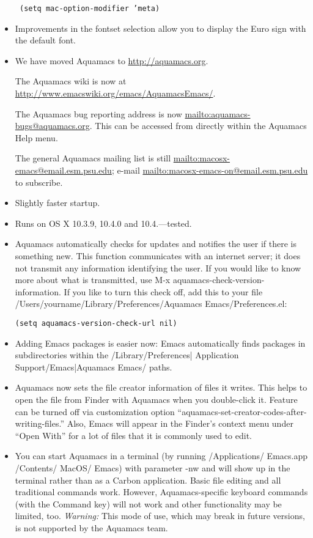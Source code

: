 \begin{itemize}
\texttt{    (setq mac-option-modifier 'meta)}

	 \item Improvements in the fontset selection allow you to display the  Euro sign
    with the default font.
     

\item We have moved Aquamacs to \url{http://aquamacs.org}.

 The Aquamacs wiki is now at \url{http://www.emacswiki.org/emacs/AquamacsEmacs/}.

 The Aquamacs bug reporting address is now \url{mailto:aquamacs-bugs@aquamacs.org}. This can be accessed from directly within the Aquamacs Help menu.

 The general Aquamacs mailing list is still \url{mailto:macosx-emacs@email.esm.psu.edu}; e-mail \url{mailto:macosx-emacs-on@email.esm.psu.edu} to subscribe.
 

\item Slightly faster startup.

\item Runs on OS X 10.3.9, 10.4.0 and 10.4.---tested.

\item Aquamacs automatically checks for updates and notifies the user
    if there is something new. This function communicates with an internet server; it does not
    transmit any information identifying the user. If you would like to
    know more about what is transmitted, use M-x
    aquamacs-check-version-information. If you like to turn this check off, add this to your file
 /Users/yourname/Library/Preferences/Aquamacs Emacs/Preferences.el:

    \texttt{(setq aquamacs-version-check-url nil)}

\item Adding Emacs packages is easier now: Emacs automatically finds
    packages in subdirectories within the /Library/{Preferences| Application
    Support}/{Emacs|Aquamacs Emacs}/ paths.

\item Aquamacs now sets the file creator information of files it
    writes. This helps to open the file from Finder with Aquamacs when
    you double-click it. Feature can be turned off via customization
    option ``aquamacs-set-creator-codes-after-writing-files.''  Also,
    Emacs will appear in the Finder's context menu under ``Open With''
    for a lot of files that it is commonly used to edit.

\item You can start Aquamacs in a terminal (by running
    /Applications/ Emacs.app /Contents/ MacOS/ Emacs) with parameter -nw
    and will show up in the terminal rather than as a  Carbon
    application. Basic file editing and all traditional commands
    work. However, Aquamacs-specific keyboard commands (with the
    Command key) will not work and other functionality may be limited,
    too. \textit{Warning: }This mode of use, which may break in future versions, is not
    supported by the Aquamacs team.
    

\end{itemize}
